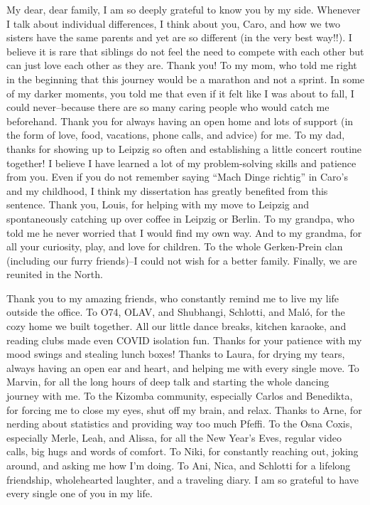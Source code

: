 \documentclass[
]{scrbook}
\begin{document}
My dear, dear family, I am so deeply grateful to know you by my side. Whenever I talk about individual differences, I think about you, Caro, and how we two sisters have the same parents and yet are so different (in the very best way!!). I believe it is rare that siblings do not feel the need to compete with each other but can just love each other as they are. Thank you! To my mom, who told me right in the beginning that this journey would be a marathon and not a sprint. In some of my darker moments, you told me that even if it felt like I was about to fall, I could never\thinspace --\thinspace because there are so many caring people who would catch me beforehand. Thank you for always having an open home and lots of support (in the form of love, food, vacations, phone calls, and advice) for me. To my dad, thanks for showing up to Leipzig so often and establishing a little concert routine together! I believe I have learned a lot of my problem-solving skills and patience from you. Even if you do not remember saying ``Mach Dinge richtig'' in Caro's and my childhood, I think my dissertation has greatly benefited from this sentence. Thank you, Louis, for helping with my move to Leipzig and spontaneously catching up over coffee in Leipzig or Berlin. To my grandpa, who told me he never worried that I would find my own way. And to my grandma, for all your curiosity, play, and love for children. To the whole Gerken-Prein clan (including our furry friends)\thinspace --\thinspace I could not wish for a better family. Finally, we are reunited in the North.

Thank you to my amazing friends, who constantly remind me to live my life outside the office. To O74, OLAV, and Shubhangi, Schlotti, and Maló, for the cozy home we built together. All our little dance breaks, kitchen karaoke, and reading clubs made even COVID isolation fun. Thanks for your patience with my mood swings and stealing lunch boxes! Thanks to Laura, for drying my tears, always having an open ear and heart, and helping me with every single move. To Marvin, for all the long hours of deep talk and starting the whole dancing journey with me. To the Kizomba community, especially Carlos and Benedikta, for forcing me to close my eyes, shut off my brain, and relax. Thanks to Arne, for nerding about statistics and providing way too much Pfeffi. To the Osna Coxis, especially Merle, Leah, and Alissa, for all the New Year's Eves, regular video calls, big hugs and words of comfort. To Niki, for constantly reaching out, joking around, and asking me how I'm doing. To Ani, Nica, and Schlotti for a lifelong friendship, wholehearted laughter, and a traveling diary. I am so grateful to have every single one of you in my life.
\end{document}
